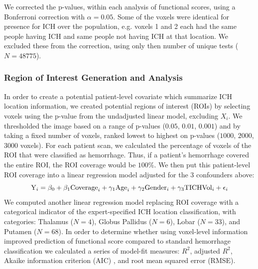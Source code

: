 \documentclass[10pt]{article}\usepackage[]{graphicx}\usepackage[]{color}
\begin{document}
We corrected the p-values, within each analysis of functional scores, using a Bonferroni correction with $\alpha = 0.05$.  Some of the voxels were identical for presence for ICH over the population, e.g. voxels 1 and 2 each had the same people having ICH and same people not having ICH at that location.  We excluded these from the correction, using only then number of unique tests ($N=48775$).

\subsubsection*{Region of Interest Generation and Analysis}



In order to create a potential patient-level covariate which summarize ICH location information, we created potential regions of interest (ROIs) by selecting voxels using the p-value from the undadjusted linear model, excluding $X_i$.  
We thresholded the image based on a range of p-values ($0.05$, $0.01$, $0.001$) and by taking a fixed number of voxels, ranked lowest to highest on p-values ($1000$, $2000$, $3000$ voxels).  For each patient scan, we calculated the percentage of voxels of the ROI that were classified as hemorrhage.  Thus, if a patient's hemorrhage covered the entire ROI, the ROI coverage would be $100\%$.  We then put this patient-level ROI coverage into a linear regression model adjusted for the $3$ confounders above:
$$
{\rm Y}_i = \beta_0 + \beta_1 {\rm Coverage}_i + \gamma_1{\rm Age}_i  +\gamma_2{\rm Gender}_i +\gamma_3{\rm TICHVol}_i + \epsilon_{i}
$$
We computed another linear regression model replacing ROI coverage with a categorical indicator of the expert-specified ICH location classification, with categories: Thalamus ($N = 4$), Globus Pallidus ($N = 6$), Lobar ($N = 33$), and Putamen ($N = 68$).  In order to determine whether using voxel-level information improved prediction of functional score compared to standard hemorrhage classification we calculated a series of model-fit measures: $R^2$, adjusted $R^2$, Akaike information criterion (AIC) \citep{akaike_information_1973}, 
and root mean squared error (RMSE).  
\end{document}
